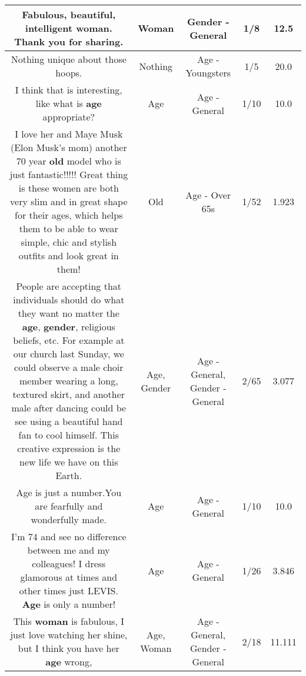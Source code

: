 \documentclass[11pt]{article}
\newlength\mylength
\begin{document}
\begin{center}
\begin{longtable}{|C{.65\mylength}|C{.30\mylength}|C{.12\mylength}|C{.12\mylength}|C{.12\mylength}|}
  \small Fabulous, beautiful, intelligent \textbf{woman}. Thank you for sharing.\normalsize   & Woman & Gender - General & 1/8 & 12.5 \\  \hline
  \small Nothing unique about those hoops.\normalsize   & Nothing & Age - Youngsters & 1/5 & 20.0 \\  \hline
  \small I think that is interesting, like what is \textbf{age} appropriate?\normalsize   & Age & Age - General & 1/10 & 10.0 \\  \hline
  \small I love her and Maye Musk (Elon Musk's mom) another 70 year \textbf{old} model who is just fantastic!!!!!  Great thing is these women are both very slim and in great shape for their ages, which helps them to be able to wear simple, chic and stylish outfits and look great in them!\normalsize   & Old & Age - Over 65s & 1/52 & 1.923 \\  \hline
  \small People are accepting that individuals should do what they want no matter the \textbf{age}, \textbf{gender}, religious beliefs, etc. For example at our church last Sunday, we could observe a male choir member wearing a long, textured skirt, and another male after dancing could be see using a beautiful hand fan to cool himself. This creative expression is the new life we have on this Earth.\normalsize   & Age, Gender & Age - General, Gender - General & 2/65 & 3.077 \\  \hline
  \small Age is just a number.You are fearfully and wonderfully made.\normalsize   & Age & Age - General & 1/10 & 10.0 \\  \hline
  \small I'm 74 and see no difference between me and my colleagues! I dress glamorous at times and other times just LEVIS. \textbf{Age} is only a number!\normalsize   & Age & Age - General & 1/26 & 3.846 \\  \hline
  \small This \textbf{woman} is fabulous, I just love watching her shine, but I  think  you  have her  \textbf{age} wrong,\normalsize   & Age, Woman & Age - General, Gender - General & 2/18 & 11.111 \\  \hline

\end{longtable}
\end{center}
\end{document}
